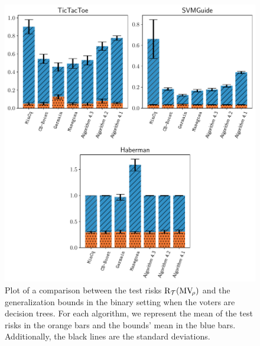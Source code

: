 \begin{figure}
    \centering
    \includegraphics[width=1.0\linewidth]{chapter_4/figures/tree_binary_2.pdf}
    \caption[Comparison Between the Test Risks and the Bounds (4/6)]{
    Plot of a comparison between the test risks $\text{R}_{\mathcal{T}}(\text{MV}_{\!\rho})$ and the generalization bounds in the binary setting when the voters are decision trees.
    For each algorithm, we represent the mean of the test risks in the orange bars and the bounds' mean in the blue bars.
    Additionally, the black lines are the standard deviations. 
    }
    \label{chap:mv:fig:tree-binary-2}
\end{figure}


